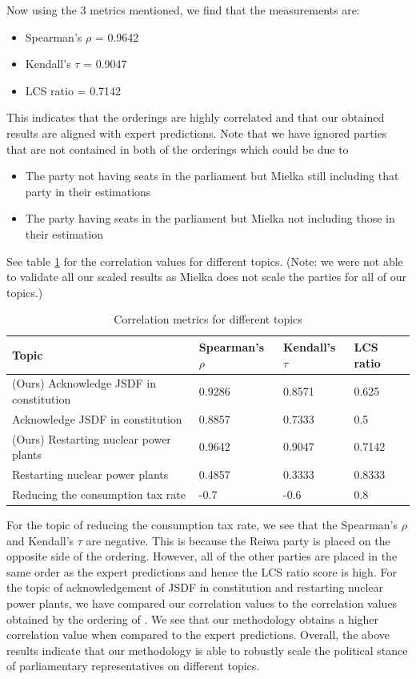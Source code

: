 \documentclass[final,5p,times,twocolumn,authoryear]{elsarticle}
\begin{document}
Now using the 3 metrics mentioned, we find that the measurements are:
\begin{itemize}
	\item Spearman's $\rho$ = 0.9642
	\item Kendall's $\tau$ = 0.9047
	\item LCS ratio = 0.7142
\end{itemize} 
This indicates that the orderings are highly correlated and that our obtained results are aligned with expert predictions. 
Note that we have ignored parties that are not contained in both of the orderings which could be due to 
\begin{itemize}
	\item The party not having seats in the parliament but Mielka still including that party in their estimations
	\item The party having seats in the parliament but Mielka not including those in their estimation
\end{itemize}

See table \ref{table:spearman} for the correlation values for different topics. (Note: we were not able to validate all our scaled results as Mielka does not scale the parties for all of our topics.)

\begin{table}[h]
\centering
\begin{tabularx}{\columnwidth}{|X|X|X|X|}
\hline
\textbf{Topic} & \textbf{Spearman's $\rho$}& \textbf{Kendall's $\tau$} &\textbf{LCS ratio}\\ \hline
(Ours) Acknowledge JSDF in constitution & 0.9286 & 0.8571& 0.625\\ \hline
\citep{kato2024lupinllmbasedpoliticalideology} Acknowledge JSDF in constitution & 0.8857 & 0.7333& 0.5\\ \hline
(Ours) Restarting nuclear power plants & 0.9642 & 0.9047& 0.7142\\ \hline
\citep{kato2024lupinllmbasedpoliticalideology} Restarting nuclear power plants & 0.4857 & 0.3333& 0.8333\\ \hline

Reducing the consumption tax rate & -0.7 & -0.6 & 0.8\\ \hline
\end{tabularx}
\caption{Correlation metrics for different topics}
\label{table:spearman}
\end{table}

For the topic of reducing the consumption tax rate, we see that the Spearman's $\rho$ and Kendall's $\tau$ are negative. This is because the Reiwa party is placed on the opposite side of the ordering. However, all of the other parties are placed in the same order as the expert predictions and hence the LCS ratio score is high. For the topic of acknowledgement of JSDF in constitution and restarting nuclear power plants, we have compared our correlation values to the correlation values obtained by the ordering of \citeauthor{kato2024lupinllmbasedpoliticalideology}. We see that our methodology obtains a higher correlation value when compared to the expert predictions. Overall, the above results indicate that our methodology is able to robustly scale the political stance of parliamentary representatives on different topics.
\end{document}
